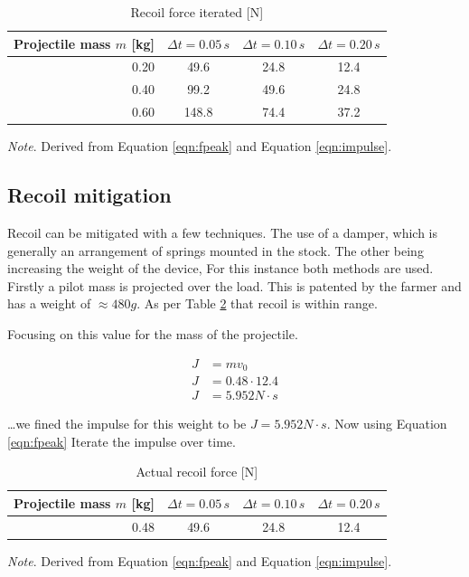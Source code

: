\documentclass[a4paper,10pt]{article} %
\begin{document}
\begin{table}[ht]
\centering
\caption{Recoil force iterated [N]}
\label{tab:recoil_forces}
\begin{threeparttable}
\begin{tabular}{@{}rccc@{}}
\toprule
Projectile mass $m$ [kg] & $\Delta t=0.05$\,$s$ & $\Delta t=0.10$\,$s$ & $\Delta t=0.20$\,$s$ \\
\midrule
0.20 & 49.6 & 24.8 & 12.4 \\
0.40 & 99.2 & 49.6 & 24.8 \\
0.60 & 148.8 & 74.4 & 37.2 \\
\bottomrule
\end{tabular}
\begin{tablenotes}[flushleft]
\footnotesize
\textit{Note}. Derived from Equation \ref{eqn:fpeak} and Equation \ref{eqn:impulse}.
\end{tablenotes}
\end{threeparttable}
\end{table}

\newpage


\subsection{Recoil mitigation}

Recoil can be mitigated with a few techniques. The use of a damper, which is generally an arrangement of springs mounted in the stock. The other being increasing the weight of the device, For this instance both methods are used. Firstly a pilot mass is projected over the load. This is patented by the farmer and has a weight of $\approx 480g$. As per Table \ref{tab:recoil_forces} that recoil is within range.

\bigskip

Focusing on this value for the mass of the projectile.


\begin{align*}
    J &= mv_0\\
    J &= 0.48 \cdot 12.4\\
    J &= 5.952 N \cdot s
\end{align*}

\ldots we fined the impulse for this weight to be $J = 5.952 N\cdot s$. Now using Equation \ref{eqn:fpeak} Iterate the impulse over time.

\begin{table}[ht]
\centering
\caption{Actual recoil force [N]}
\label{tab:recoil_forces}
\begin{threeparttable}
\begin{tabular}{@{}rccc@{}}
\toprule
Projectile mass $m$ [kg] & $\Delta t=0.05$\,$s$ & $\Delta t=0.10$\,$s$ & $\Delta t=0.20$\,$s$ \\
\midrule
0.48 & 49.6 & 24.8 & 12.4 \\
\bottomrule
\end{tabular}
\begin{tablenotes}[flushleft]
\footnotesize
\textit{Note}. Derived from Equation \ref{eqn:fpeak} and Equation \ref{eqn:impulse}.
\end{tablenotes}
\end{threeparttable}
\end{table}
\end{document}
